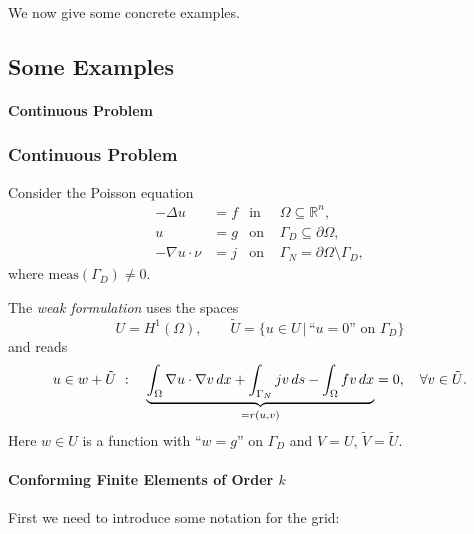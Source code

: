 We now give some concrete examples.

\subsection{Some Examples}

\paragraph{Continuous Problem}

\begin{frame}
\frametitle<presentation>{Continuous Problem}

Consider the Poisson equation
\begin{subequations}
\label{Eq:DiffusionEquation}
\begin{align}
                -\Delta u &= f& \text{in }& \Omega\subseteq\mathbb{R}^n,\\
                        u &= g& \text{on }& \Gamma_D\subseteq\partial\Omega,\\
     - \nabla u\cdot\nu   &= j& \text{on }& \Gamma_N=\partial\Omega\setminus\Gamma_D,
\end{align}
\end{subequations}
where $\mbox{meas}(\Gamma_D)\neq 0$. 

The \textit{weak formulation} uses the spaces
\begin{equation*}
U = H^1(\Omega), \qquad
\tilde{U} = \{u \in U\,|\, \text{``$u=0$'' on $\Gamma_D$}
\}
\end{equation*}
and reads
\begin{equation}\label{Eq:DiffusionWeakForm}
u \in w+\tilde{U} \  : \quad
\underbrace{\int_\Omega \nabla u \cdot \nabla v \,d x
+ \int_{\Gamma_N} j v \,d s - \int_\Omega f v \,dx}_{= r(u,v)} = 0,  
\quad \forall v\in \tilde{U}.
\end{equation}
Here $w\in U$ is a function with ``$w=g$'' on $\Gamma_D$ and $V=U$, $\tilde{V}=\tilde{U}$.
\end{frame}


\paragraph{Conforming Finite Elements of Order $k$}

First we need to introduce some notation for the grid:

